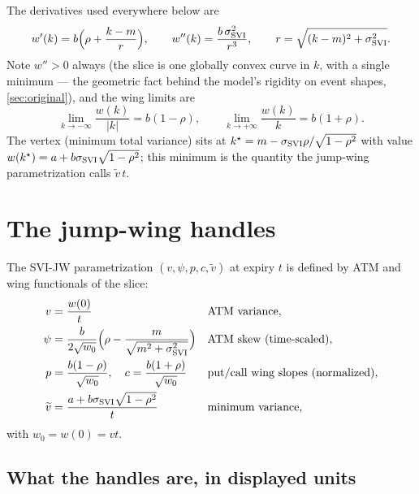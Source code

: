 \documentclass[11pt]{article}
\begin{document}
The derivatives used everywhere below are
\begin{equation}
w'(k)=b\Big(\rho+\frac{k-m}{r}\Big),\qquad
w''(k)=\frac{b\,\sigma_{\mathrm{SVI}}^2}{r^3},\qquad
r=\sqrt{(k-m)^2+\sigma_{\mathrm{SVI}}^2}.
\label{eq:svi_deriv}
\end{equation}
Note $w''>0$ always (the slice is one globally convex curve in $k$, with a
single minimum --- the geometric fact behind the model's rigidity on event
shapes, \cref{sec:original}), and the wing limits are
\begin{equation}
\lim_{k\to-\infty}\frac{w(k)}{|k|}=b(1-\rho),
\qquad
\lim_{k\to+\infty}\frac{w(k)}{k}=b(1+\rho).
\label{eq:svi_wings}
\end{equation}
The vertex (minimum total variance) sits at $k^\star=m-\sigma_{\mathrm{SVI}}\rho/\sqrt{1-\rho^2}$
with value $w(k^\star)=a+b\sigma_{\mathrm{SVI}}\sqrt{1-\rho^2}$; this minimum is the quantity the
jump-wing parametrization calls $\widetilde v\,t$.

\section{The jump-wing handles}
\label{sec:jw}

The SVI-JW parametrization $(v,\psi,p,c,\widetilde v)$ at expiry $t$ is defined by
ATM and wing functionals of the slice:
\begin{equation}
\begin{aligned}
v&=\frac{w(0)}{t} && \text{ATM variance,}\\
\psi&=\frac{b}{2\sqrt{w_0}}\Big(\rho-\frac{m}{\sqrt{m^2+\sigma_{\mathrm{SVI}}^2}}\Big) && \text{ATM skew (time-scaled),}\\
p&=\frac{b(1-\rho)}{\sqrt{w_0}},\quad c=\frac{b(1+\rho)}{\sqrt{w_0}} && \text{put/call wing slopes (normalized),}\\
\widetilde v&=\frac{a+b\sigma_{\mathrm{SVI}}\sqrt{1-\rho^2}}{t} && \text{minimum variance,}
\end{aligned}
\label{eq:jw_def}
\end{equation}
with $w_0=w(0)=vt$.

\subsection{What the handles are, in displayed units}
\label{sec:jw_units}
\end{document}
